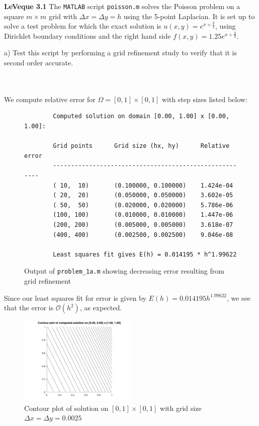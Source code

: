 \textbf{LeVeque 3.1} The \texttt{MATLAB} script \texttt{poisson.m} solves the Poisson problem on a square $m \times m$ 
grid with $\Delta x = \Delta y = h $ using the 5-point Laplacian. It is set up to solve a test problem for which the 
exact solution is $u(x, y) = e^{x + \frac{y}{2}}$, using Dirichlet boundary conditions and the right hand side 
$f(x, y) = 1.25 e^{x + \frac{y}{2}}$.

a) Test this script by performing a grid refinement study to verify that it is second order accurate.

\begin{solution}\ \\\\
    We compute relative error for $\Omega = [0, 1] \times [0, 1]$ with step sizes listed below:

    \begin{figure}[h]
        \begin{lstlisting}
        Computed solution on domain [0.00, 1.00] x [0.00, 1.00]: 
 
        Grid points      Grid size (hx, hy)      Relative error
        -------------------------------------------------------
        ( 10,  10)       (0.100000, 0.100000)    1.424e-04 
        ( 20,  20)       (0.050000, 0.050000)    3.602e-05 
        ( 50,  50)       (0.020000, 0.020000)    5.786e-06 
        (100, 100)       (0.010000, 0.010000)    1.447e-06 
        (200, 200)       (0.005000, 0.005000)    3.618e-07 
        (400, 400)       (0.002500, 0.002500)    9.046e-08 
             
        Least squares fit gives E(h) = 0.014195 * h^1.99622
        \end{lstlisting}
        \caption{Output of \texttt{problem\_1a.m} showing decreasing error resulting from grid refinement}
    \end{figure}

    Since our least squares fit for error is given by $E(h) = 0.014195 h^{1.99622}$, we see that the error is 
    $\mathcal{O}(h^2)$, as expected.
    
    \begin{figure}[h]
        \centering
        \includegraphics[width=0.5\textwidth]{poisson_5pt_stencil_0-0_1-1_hx-0.003_hy-0.003.png}
        \caption{Contour plot of solution on $[0, 1] \times [0, 1]$ with grid size $\Delta x = \Delta y = 0.0025$}
    \end{figure}
\end{solution}

